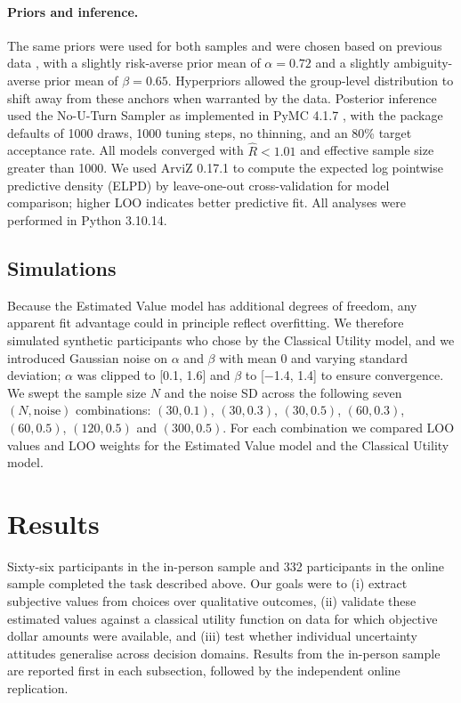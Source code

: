 \documentclass[11pt]{article}
\begin{document}
\paragraph{Priors and inference.} The same priors were used for both samples and were chosen based on previous data \citep{levy2012measuring}, with a slightly risk-averse prior mean of $\alpha = 0.72$ and a slightly ambiguity-averse prior mean of $\beta = 0.65$. Hyperpriors allowed the group-level distribution to shift away from these anchors when warranted by the data. Posterior inference used the No-U-Turn Sampler \citep{hoffman2014nuts} as implemented in PyMC 4.1.7 \citep{salvatier2016pymc3}, with the package defaults of 1000 draws, 1000 tuning steps, no thinning, and an 80\% target acceptance rate. All models converged with $\hat{R} < 1.01$ and effective sample size greater than 1000. We used ArviZ 0.17.1 \citep{kumar2019arviz} to compute the expected log pointwise predictive density (ELPD) by leave-one-out cross-validation \citep{vehtari2017loo} for model comparison; higher LOO indicates better predictive fit. All analyses were performed in Python 3.10.14.

\subsection{Simulations}

Because the Estimated Value model has additional degrees of freedom, any apparent fit advantage could in principle reflect overfitting. We therefore simulated synthetic participants who chose by the Classical Utility model, and we introduced Gaussian noise on $\alpha$ and $\beta$ with mean 0 and varying standard deviation; $\alpha$ was clipped to [0.1, 1.6] and $\beta$ to [$-$1.4, 1.4] to ensure convergence. We swept the sample size $N$ and the noise SD across the following seven $(N, \text{noise})$ combinations: $(30, 0.1)$, $(30, 0.3)$, $(30, 0.5)$, $(60, 0.3)$, $(60, 0.5)$, $(120, 0.5)$ and $(300, 0.5)$. For each combination we compared LOO values and LOO weights for the Estimated Value model and the Classical Utility model.

\section{Results}

Sixty-six participants in the in-person sample and 332 participants in the online sample completed the task described above. Our goals were to (i) extract subjective values from choices over qualitative outcomes, (ii) validate these estimated values against a classical utility function on data for which objective dollar amounts were available, and (iii) test whether individual uncertainty attitudes generalise across decision domains. Results from the in-person sample are reported first in each subsection, followed by the independent online replication.
\end{document}
